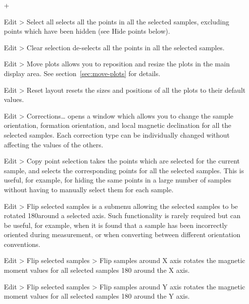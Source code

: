 \documentclass[a4paper,british]{article}
\newcommand{\menuitemlabel}[1]{%
\mbox{\textsf{#1}}\hfil}
\newenvironment{menuitemlist}%
{\begin{list}{}{%
\renewcommand{\makelabel}{\menuitemlabel}%
\setlength{\labelwidth}{35pt}%
\setlength{\leftmargin}%
             {\labelwidth+\labelsep}}}%
{\end{list}}
\newcommand{\ppcmd}[1]{\textsf{#1}} %
\newcommand{\submenu}{ \textgreater{} } %
\begin{document}
\begin{menuitemlist}

\item[Edit\submenu Select all] selects all the points in all the selected
samples, excluding points which have been hidden (see \ppcmd{Hide points}
below).

\item[Edit\submenu Clear selection] de-selects all the points in all
the selected samples.

\item[Edit\submenu Move plots] allows you to reposition and resize the plots
  in the main display area. See section~\ref{sec:move-plots} for
  details.

\item[Edit\submenu Reset layout] resets the sizes and positions of
all the plots to their default values.

\item[Edit\submenu Corrections\ldots] opens a window which allows you to
change the sample orientation, formation orientation, and local magnetic
declination for all the selected samples. Each correction type can be
individually changed without affecting the values of the others.

\item[Edit\submenu Copy point selection] takes the points which are selected
  for the current sample, and selects the corresponding points for all the
  selected samples. This is useful, for example, for hiding the same points
  in a large number of samples without having to manually select them for
  each sample.

\item[Edit\submenu Flip selected samples] is a submenu allowing the selected
  samples to be rotated 180\textdegree around a selected axis. Such
  functionality is rarely required but can be useful, for example, when it is
  found that a sample has been incorrectly oriented during measurement, or
  when converting between different orientation conventions.

\item[Edit\submenu Flip selected samples\submenu Flip samples around X axis]
  rotates the magnetic moment values for all selected samples 180\textdegree
  around the X axis.

\item[Edit\submenu Flip selected samples\submenu Flip samples around Y axis]
  rotates the magnetic moment values for all selected samples 180\textdegree
  around the Y axis.


\end{menuitemlist}
\end{document}
